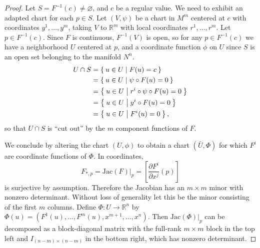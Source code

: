 \begin{proof}
Let $S = F^{-1}(c) \neq \varnothing$, and $c$ be a regular value. We
need to exhibit an adapted chart for each $p \in S$. Let $(V, \psi)$
be a chart in $M^m$ centered at $c$ with coordinates $y^1, \dots,
y^m$, taking $V$ to $\mathbb{R}^m$ with local coordinates $r^1, \dots,
r^m$. Let $p \in F^{-1}(c)$. Since $F$ is continuous, $F^{-1}(V)$ is
open, so for any $p \in F^{-1}(c)$ we have a neighborhood $U$ centered
at $p$, and a coordinate function $\phi$ on $U$ since $S$ is an open
set belonging to the manifold $N^n$.
\begin{align*}
   U \cap S
&= \Set{ u \in U | F(u) = c } \\
&= \Set{ u \in U | \psi \circ F(u) = 0 } \\
&= \Set{ u \in U | r^i \circ \psi \circ F(u) = 0 } \\
&= \Set{ u \in U | y^i \circ F(u) = 0 } \\
&= \Set{ u \in U | F^i(u) = 0 },
\end{align*}
so that $U \cap S$ is ``cut out'' by the $m$ component functions of
$F$.

We conclude by altering the chart $(U, \phi)$ to obtain a chart
$(\bar{U}, \Phi)$ for which $F^i$ are coordinate functions of $\Phi$.
In coordinates,
$$
  F_{\ast, p}
= \mathrm{Jac}(F)|_p
= \left[\frac{\partial F^i}{\partial x^j}(p)\right]
$$
is surjective by assumption. Therefore the Jacobian has an $m \times
m$ minor with nonzero determinant. Without loss of generality let this
be the minor consisting of the first $m$ columns. Define
$\Phi: U \to \mathbb{R}^n$ by
$\Phi(u) = (F^1(u), \dots, F^m(u), x^{m+1}, \dots, x^n)$. Then
$\mathrm{Jac}(\Phi)|_p$
can be decomposed as a block-diagonal matrix with the full-rank
$m \times m$ block in the top left and $I_{(n - m) \times (n - m)}$ in
the bottom right, which has nonzero determinant.
\end{proof}

